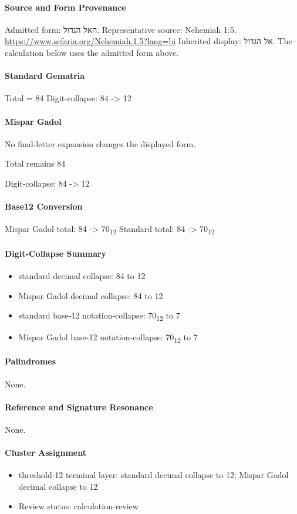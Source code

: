 \paragraph{Source and Form Provenance}
Admitted form: האל הגדול.
Representative source: Nehemiah 1:5.
\url{https://www.sefaria.org/Nehemiah.1.5?lang=bi}
Inherited display: אל הגדול. The calculation below uses the admitted form above.
\paragraph{Standard Gematria}
Total = 84
Digit-collapse: 84 -> 12
\paragraph{Mispar Gadol}
No final-letter expansion changes the displayed form.

Total remains 84

Digit-collapse: 84 -> 12
\paragraph{Base12 Conversion}
Mispar Gadol total: 84 -> 70\textsubscript{12}
Standard total: 84 -> 70\textsubscript{12}
\paragraph{Digit-Collapse Summary}
\begin{itemize}
\item standard decimal collapse: 84 to 12
\item Mispar Gadol decimal collapse: 84 to 12
\item standard base-12 notation-collapse: 70\textsubscript{12} to 7
\item Mispar Gadol base-12 notation-collapse: 70\textsubscript{12} to 7
\end{itemize}
\paragraph{Palindromes}
None.
\paragraph{Reference and Signature Resonance}
None.
\paragraph{Cluster Assignment}
\begin{itemize}
\item threshold-12 terminal layer: standard decimal collapse to 12; Mispar Gadol decimal collapse to 12
\item Review status: calculation-review
\end{itemize}

